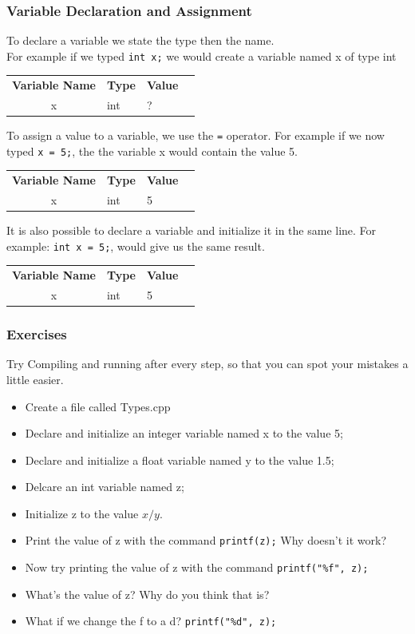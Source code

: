 \documentclass{if-beamer}
\begin{document}
\begin{frame}
\frametitle{Variable Declaration and Assignment}
To declare a variable we state the type then the name. \\
For example if we typed \texttt{int x;} we would create a variable named x of type int 
\begin{table}
	\begin{tabular}{cl l l}
		\textbf{Variable Name} & \textbf{Type} & \textbf{Value}\\
		x & int & ? \\
	\end{tabular}
\end{table}

To assign a value to a variable, we use the \texttt{=} operator. For example if we now typed \texttt{x = 5;}, the the variable x would contain the value 5.
\begin{table}
	\begin{tabular}{cl l l}
		\textbf{Variable Name} & \textbf{Type} & \textbf{Value}\\
		x & int & 5 \\
	\end{tabular}
\end{table}

It is also possible to declare a variable and initialize it in the same line.
For example: \texttt{int x = 5;}, would give us the same result.
\begin{table}
	\begin{tabular}{cl l l}
		\textbf{Variable Name} & \textbf{Type} & \textbf{Value}\\
		x & int & 5 \\
	\end{tabular}
\end{table}
\end{frame}


\begin{frame}
\frametitle{Exercises}
Try Compiling and running after every step, so that you can spot your mistakes a little easier. 
\begin{itemize}
\item Create a file called Types.cpp
\item Declare and initialize an integer variable named x to the value 5;
\item Declare and initialize a float variable named y to the value 1.5;
\item Delcare an int variable named z;
\item Initialize z to the value $x / y$. 
\item Print the value of z with the command \texttt{printf(z);} Why doesn't it work?
\item Now try printing the value of z with the command \texttt{printf("\%f", z);}
\item What's the value of z? Why do you think that is?
\item What if we change the f to a d? \texttt{printf("\%d", z);}
\end{itemize}
\end{frame}
\end{document}
